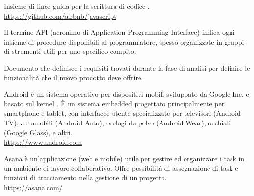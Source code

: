 Insieme di linee guida per la scrittura di codice .\\
\url{https://github.com/airbnb/javascript}

Il termine API (acronimo di Application Programming Interface) indica ogni insieme di procedure disponibili al programmatore, spesso organizzate in gruppi di strumenti utili per uno specifico compito.

Documento che definisce i requisiti trovati durante la fase di analisi per definire le funzionalit\`a che il nuovo prodotto deve offrire.

Android è un sistema operativo per dispositivi mobili sviluppato da Google Inc. e basato sul kernel . \`{E} un sistema embedded progettato principalmente per smartphone e tablet, con interfacce utente specializzate per televisori (Android TV), automobili (Android Auto), orologi da polso (Android Wear), occhiali (Google Glass), e altri.\\
\url{https://www.android.com}

Asana è un’applicazione (web e mobile) utile per gestire ed organizzare i task in un ambiente di lavoro collaborativo. Offre possibilità di assegnazione di task e funzioni di tracciamento nella gestione di un progetto.\\
\url{https://asana.com/}
\clearpage